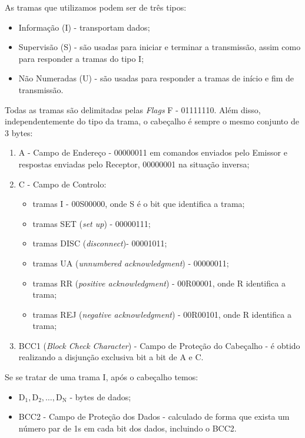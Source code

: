 \documentclass[11pt,a4paper,reqno]{report}
\numberwithin{equation}{section}
\begin{document}
\begin{appendices}
As tramas que utilizamos podem ser de três tipos:
\begin{itemize}
	\item Informação (I) - transportam dados;
	\item Supervisão (S) - são usadas para iniciar e terminar a transmissão, assim como para responder a tramas do tipo I;
	\item Não Numeradas (U) - são usadas para responder a tramas de início e fim de transmissão.
\end{itemize}

Todas as tramas são delimitadas pelas \emph{Flags} F - 01111110. Além disso, independentemente do tipo da trama, o cabeçalho é sempre o mesmo conjunto de 3 bytes:
\begin{enumerate}
	\item A - Campo de Endereço - 00000011 em comandos enviados pelo Emissor e respostas enviadas pelo Receptor, 00000001 na situação inversa;
	\item C - Campo de Controlo:
		\begin{itemize}
			\item tramas I - 00S00000, onde S é o bit que identifica a trama;
			\item tramas SET (\emph{set up}) - 00000111;
			\item tramas DISC (\emph{disconnect})- 00001011;
			\item tramas UA (\emph{unnumbered acknowledgment}) - 00000011;
			\item tramas RR (\emph{positive acknowledgment}) - 00R00001, onde R identifica a trama;
			\item tramas REJ (\emph{negative acknowledgment}) - 00R00101, onde R identifica a trama;
		\end{itemize}
	\item BCC1 (\emph{Block Check Character}) - Campo de Proteção do Cabeçalho - é obtido realizando a disjunção exclusiva bit a bit de A e C.
\end{enumerate} 

Se se tratar de uma trama I, após o cabeçalho temos:
\begin{itemize}
	\item $\text{D}_{\text{1}}, \text{D}_{\text{2}}, \ldots, \text{D}_{\text{N}}$ - bytes de dados;
	\item BCC2 - Campo de Proteção dos Dados - calculado de forma que exista um número par de 1s em cada bit dos dados, incluindo o BCC2.
\end{itemize}


\end{appendices}
\end{document}

